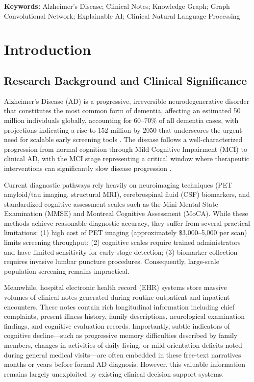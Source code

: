 \documentclass[11pt,onecolumn,a4paper]{article}
\begin{document}
\noindent\textbf{Keywords:} Alzheimer's Disease; Clinical Notes; Knowledge Graph; Graph Convolutional Network; Explainable AI; Clinical Natural Language Processing

\section{Introduction}

\subsection{Research Background and Clinical Significance}

Alzheimer's Disease (AD) is a progressive, irreversible neurodegenerative disorder that constitutes the most common form of dementia, affecting an estimated 50 million individuals globally, accounting for 60--70\% of all dementia cases, with projections indicating a rise to 152 million by 2050 that underscores the urgent need for scalable early screening tools \cite{WHO2021}. The disease follows a well-characterized progression from normal cognition through Mild Cognitive Impairment (MCI) to clinical AD, with the MCI stage representing a critical window where therapeutic interventions can significantly slow disease progression \cite{Petersen2016}.

Current diagnostic pathways rely heavily on neuroimaging techniques (PET amyloid/tau imaging, structural MRI), cerebrospinal fluid (CSF) biomarkers, and standardized cognitive assessment scales such as the Mini-Mental State Examination (MMSE) and Montreal Cognitive Assessment (MoCA). While these methods achieve reasonable diagnostic accuracy, they suffer from several practical limitations: (1) high cost of PET imaging (approximately \$3,000--5,000 per scan) limits screening throughput; (2) cognitive scales require trained administrators and have limited sensitivity for early-stage detection; (3) biomarker collection requires invasive lumbar puncture procedures. Consequently, large-scale population screening remains impractical.

Meanwhile, hospital electronic health record (EHR) systems store massive volumes of clinical notes generated during routine outpatient and inpatient encounters. These notes contain rich longitudinal information including chief complaints, present illness history, family descriptions, neurological examination findings, and cognitive evaluation records. Importantly, subtle indicators of cognitive decline---such as progressive memory difficulties described by family members, changes in activities of daily living, or mild orientation deficits noted during general medical visits---are often embedded in these free-text narratives months or years before formal AD diagnosis. However, this valuable information remains largely unexploited by existing clinical decision support systems.
\end{document}
